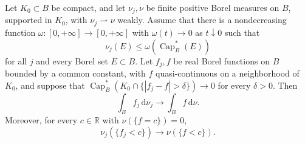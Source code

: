 \begin{lemma}\label{lem:capacity-controlled-measure-weights}
Let $K_0\subset B$ be compact, and let $\nu_j,\nu$ be finite positive Borel measures on $B$, supported in $K_0$, with $\nu_j\rightharpoonup\nu$ weakly. Assume that there is a nondecreasing function $\omega\colon[0,+\infty]\to[0,+\infty]$ with $\omega(t)\to0$ as $t\downarrow0$ such that
\[
 \nu_j(E)\leq\omega(\operatorname{Cap}_B^*(E))
\]
for all $j$ and every Borel set $E\subset B$. Let $f_j,f$ be real Borel functions on $B$ bounded by a common constant, with $f$ quasi-continuous on a neighborhood of $K_0$, and suppose that $\operatorname{Cap}_B^*(K_0\cap\{|f_j-f|>\delta\})\to0$ for every $\delta>0$. Then
\[
 \int_Bf_j\,\mathrm d\nu_j\longrightarrow\int_Bf\,\mathrm d\nu.
\]
Moreover, for every $c\in\mathbb R$ with $\nu(\{f=c\})=0$,
\begin{equation}\label{eq:capacity-controlled-moving-level-sets}
 \nu_j(\{f_j<c\})\longrightarrow\nu(\{f<c\}).
\end{equation}
\end{lemma}
